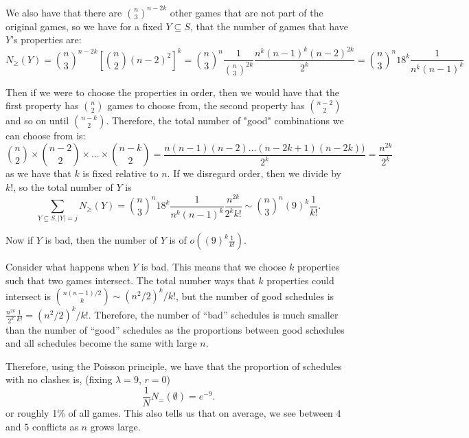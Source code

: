 \documentclass[]{article}
\theoremstyle{definition}
\numberwithin{theorem}{section}
\numberwithin{equation}{section}
\begin{document}
We also have that there are $\binom{n}{3}^{n - 2k}$ other games that are not part of the original games, so we have for a fixed $Y \subseteq S$, that the number of games that have $Y$'s properties are:
\begin{equation}
	N_\geq(Y) = \binom{n}{3}^{n - 2k} \left[ \binom{n}{2} (n - 2)^2 \right]^k = \binom{n}{3}^n \frac{1}{\binom{n}{3}^{2k}} \frac{n^{k} (n - 1)^{k} (n - 2)^{2k}}{2^{k}} = \binom{n}{3}^n 18^{k} \frac{1}{n^k(n-1)^k}
\end{equation}


Then if we were to choose the properties in order, then we would have that the first property has $\binom{n}{2}$ games to choose from, the second property has $\binom{n-2}{2}$ and so on until $\binom{n-k}{2}$. Therefore, the total number of "good" combinations we can choose from is:
\begin{equation}
	\binom{n}{2} \times \binom{n-2}{2} \times ... \times \binom{n - k}{2} = \frac{n(n -1) (n - 2) ... (n - 2k + 1)(n - 2k))}{2^k} = \frac{n^{2k}}{2^k}
\end{equation}
as we have that $k$ is fixed relative to $n$. 
If we disregard order, then we divide by $k!$, so the total number of $Y$ is
\begin{equation}
	\sum_{Y \subseteq S, |Y| = j} N_\geq(Y) = \binom{n}{3}^n 18^{k} \frac{1}{n^k(n-1)^k}\frac{n^{2k}}{2^k k!} \sim \binom{n}{3}^n \left(9\right)^k \frac{1}{k!}.
\end{equation}

Now if $Y$ is bad, then the number of $Y$ is of $o(\left(9\right)^k \frac{1}{k!})$.

Consider what happens when $Y$ is bad. This means that we choose $k$ properties such that two games intersect. The total number ways that $k$ properties could intersect is $\binom{n(n - 1)/2}{k} \sim (n^2/2)^k/k!$, but the number of good schedules is $\frac{n^{2k}}{2^k}\frac{1}{k!} = (n^2/2)^k/ k!$. Therefore, the number of ``bad'' schedules is much smaller than the number of ``good''  schedules as the proportions between good schedules and all schedules become the same with large $n$. 

Therefore, using the Poisson principle, we have that the proportion of schedules with no clashes is, (fixing $\lambda = 9$, $r = 0$)
\begin{equation}
	\frac{1}{N} N_=(\emptyset) = e^{-9}.
\end{equation}
or roughly 1\% of all games.
This also tells us that on average, we see between $4$ and $5$ conflicts as $n$ grows large. 
\end{document}

